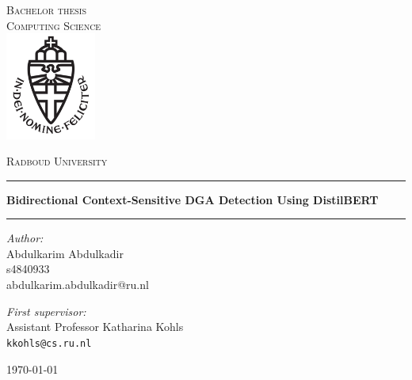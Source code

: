 \documentclass[11pt,a4paper]{report}
\begin{document}
\begin{titlepage}
    \begin{center}
        \textsc{\LARGE Bachelor thesis\\Computing Science}\\[1.5cm]
        \includegraphics[height=100pt]{logo}

        \vspace{0.4cm}
        \textsc{\Large Radboud University}\\[1cm]
        \hrule
        \vspace{0.4cm}
        \textbf{\huge Bidirectional Context-Sensitive DGA Detection Using DistilBERT}\\[0.4cm]
        \hrule
        \vspace{2cm}
        \begin{minipage}[t]{0.45\textwidth}
            \begin{flushleft} \large
                \textit{Author:}\\
                Abdulkarim Abdulkadir\\
                s4840933\\
                abdulkarim.abdulkadir@ru.nl
            \end{flushleft}
        \end{minipage}
        \begin{minipage}[t]{0.45\textwidth}
            \begin{flushright} \large
                \textit{First supervisor:}\\
                Assistant Professor Katharina Kohls\\
                \texttt{kkohls@cs.ru.nl}\\[1.3cm]
            \end{flushright}
        \end{minipage}
        \vfill
        {\large \today}
    \end{center}
\end{titlepage}



\tableofcontents










\appendix

\end{document}
